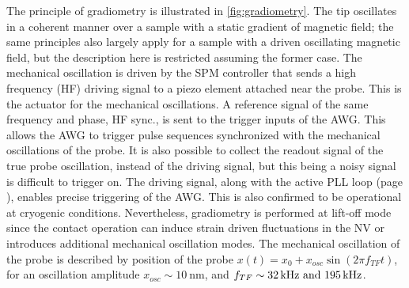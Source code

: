 The principle of gradiometry is illustrated in \cref{fig:gradiometry}. The tip oscillates in a coherent manner over a sample with a static gradient of magnetic field; the same principles also largely apply for a sample with a driven oscillating magnetic field, but the description here is restricted assuming the former case. The mechanical oscillation is driven by the \gls{SPM} controller that sends a high frequency (\gls{HF}) driving signal to a piezo element attached near the probe. This is the actuator for the mechanical oscillations. A reference signal of the same frequency and phase, \gls{HF} sync., is sent to the trigger inputs of the \gls{AWG}. This allows the \gls{AWG} to trigger pulse sequences synchronized with the mechanical oscillations of the probe. It is also possible to collect the readout signal of the true probe oscillation, instead of the driving signal, but this being a noisy signal is difficult to trigger on. The driving signal, along with the active \gls{PLL} loop (page \pageref{sub:control_loops}), enables precise triggering of the \gls{AWG}. This is also confirmed to be operational at cryogenic conditions. Nevertheless, gradiometry is performed at lift-off mode since the contact operation can induce strain driven fluctuations in the \gls{NV}\cite{huxterScanningGradiometrySingle2022,ovartchaiyapongDynamicStrainmediatedCoupling2014} or introduces additional mechanical oscillation modes. The mechanical oscillation of the probe is described by position of the probe $x(t)=x_0 + x_{osc} \sin(2\pi f_{TF}t)$, for an oscillation amplitude $x_{osc}\sim\qty{10}{\nano\meter}$, and $f_{TF}\sim\qtylist{32;195}{\kilo\hertz}$.

